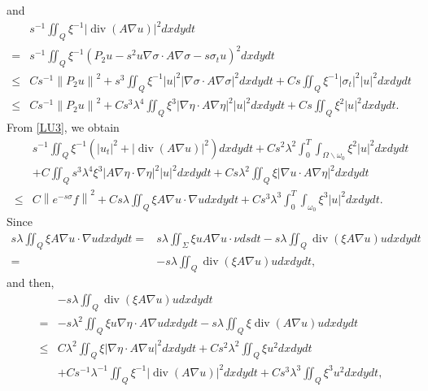 \documentclass[9pt,reqno]{amsart}
\theoremstyle{plain}
\numberwithin{equation}{section}
\numberwithin{theorem}{section}
\def\Om{\Omega}
\DeclareMathOperator*{\Div}{\mathrm{div}}
\def\Om{\Omega}
\begin{document}
	and
	\begin{equation*}
		\begin{split}
			&s^{-1}   \iint_Q \xi^{-1}\left|\Div(A\nabla u)\right|^2dx dy d t\\
			=& s^{-1}   \iint_Q \xi^{-1}(P_2 u -s^2 u \nabla \sigma \cdot A \nabla \sigma - s \sigma_t u)^2dx dy d t\\
			\leq& C s^{-1} \left\|P_2 u\right\|^2+s^3   \iint_Q \xi^{-1}|u|^2\left|\nabla \sigma \cdot A \nabla \sigma\right|^2dx dy d t +C s   \iint_Q \xi^{-1}\left|\sigma_t\right|^2|u|^2dx dy d t \\
			\leq& C s^{-1} \left\|P_2 u\right\|^2+C s^3 \lambda^4   \iint_Q \xi^3|\nabla \eta \cdot A \nabla \eta|^2|u|^2dx dy d t +C s   \iint_Q \xi^{2}|u|^2dx dy d t.
		\end{split}
	\end{equation*}
	From \eqref{LU3}, we obtain
	\begin{equation}\label{LU4}
		\begin{split}
			&s^{-1}\iint_{Q} \xi^{-1} (|u_t |^2 + \left|\Div(A\nabla u)\right|^2) dx dydt +C s^2 \lambda^2 \int_0^T \int_{\Om\backslash \omega_0} \xi^{2}|u|^2dx dy d t\\
			&+C\iint_Q s^3 \lambda^4 \xi^3\left|A \nabla \eta \cdot \nabla \eta \right|^2|u|^2 dx dydt  + C s  \lambda^2 \iint_Q\xi|\nabla u \cdot A \nabla \eta|^2 dx dy d t\\
			\leq& C\left\|e^{-s \sigma} f\right\|^2
			+Cs \lambda \iint_Q \xi A \nabla u \cdot \nabla udx dy d t+Cs^3 \lambda^3 \int_0^T \int_{\omega_0} \xi^3|u|^2dx dy d t.
		\end{split}
	\end{equation}
	Since
	\begin{equation*}
		\begin{split}
			s \lambda \iint_Q \xi A \nabla u \cdot \nabla udx dy d t=& s \lambda \iint_\Sigma \xi u A \nabla u \cdot \nu d s d t - s \lambda \iint_Q \Div(\xi A\nabla u) udx dy d t\\
			=&- s \lambda \iint_Q \Div(\xi A\nabla u) udx dy d t,
		\end{split}
	\end{equation*}
	and then,
	\begin{equation*}
		\begin{split}
			&- s \lambda \iint_Q \Div(\xi A\nabla u) udx dy d t\\
			=&- s \lambda^2 \iint_Q \xi u\nabla \eta \cdot A\nabla u dx dy d t - s \lambda \iint_Q \xi\Div( A\nabla u) udx dy d t\\
			\le& C \lambda^2 \iint_Q \xi \left|  \nabla \eta \cdot A\nabla u \right| ^2dx dy d t + Cs^2 \lambda^2 \iint_Q \xi u^2dx dy d t\\
			&+C s^{-1} \lambda^{-1} \iint_Q \xi^{-1} \left| \Div( A\nabla u)\right| ^2dx dy d t + Cs^3 \lambda^3 \iint_Q \xi^3 u^2dx dy d t,
		\end{split}
	\end{equation*}
\end{document}
